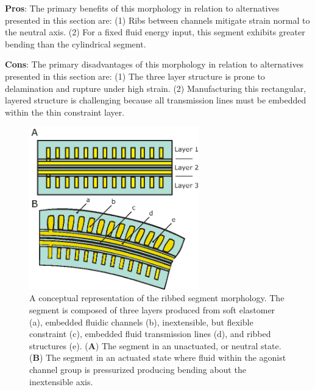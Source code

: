 \textbf{Pros}: The primary benefits of this morphology in relation to alternatives presented in this section are: (1) Ribs between channels mitigate strain normal to the neutral axis. (2) For a fixed fluid energy input, this segment exhibits greater bending than the cylindrical segment.

\textbf{Cons}: The primary disadvantages of this morphology in relation to alternatives presented in this section are: (1) The three layer structure is prone to delamination and rupture under high strain. (2) Manufacturing this rectangular, layered structure is challenging because all transmission lines must be embedded within the thin constraint layer.

\begin{figure}[htb]
\centering
\includegraphics[width=2.9in]{Figures/actuators/ribbed_design.eps}
\caption[A conceptual representation of the ribbed segment morphology]{A conceptual representation of the ribbed segment morphology. The segment is composed of three layers produced from soft elastomer (a), embedded fluidic channels (b), inextensible, but flexible constraint (c), embedded fluid transmission lines (d), and ribbed structures (e). (\textbf{A}) The segment in an unactuated, or neutral state. (\textbf{B}) The segment in an actuated state where fluid within the agonist channel group is pressurized producing bending about the inextensible axis.} \label{fig:ribbed design}
\end{figure}

